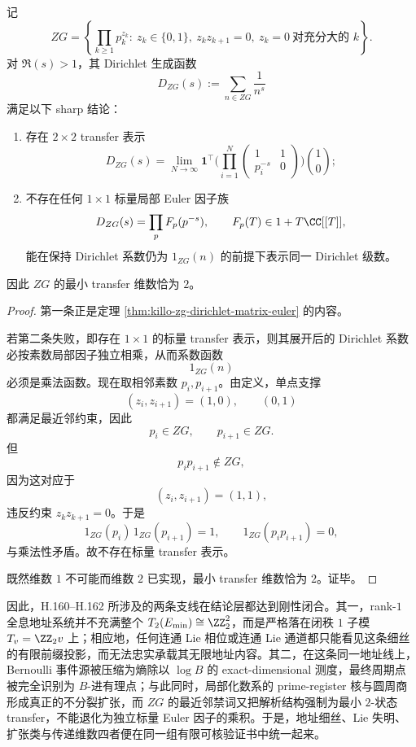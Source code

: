 \begin{theorem}\label{thm:conclusion-zg-minimal-transfer-dimension-two}
记
\[
ZG=
\left\{
\prod_{k\ge 1}p_k^{z_k}:\ z_k\in\{0,1\},\ z_kz_{k+1}=0,\ z_k=0\ \text{对充分大的 }k
\right\}.
\]
对 \(\Re(s)>1\)，其 Dirichlet 生成函数
\[
D_{ZG}(s):=\sum_{n\in ZG}\frac{1}{n^s}
\]
满足以下 sharp 结论：
\begin{enumerate}
  \item 存在 \(2\times 2\) transfer 表示
  \[
  D_{ZG}(s)
  =
  \lim_{N\to\infty}
  \mathbf 1^\top
  \Biggl(
  \prod_{i=1}^{N}
  \begin{pmatrix}
  1&1\\
  p_i^{-s}&0
  \end{pmatrix}
  \Biggr)
  \binom10;
  \]
  \item 不存在任何 \(1\times 1\) 标量局部 Euler 因子族
  \[
  D_{ZG}(s)=\prod_{p}F_p(p^{-s}),
  \qquad
  F_p(T)\in 1+T\CC[[T]],
  \]
  能在保持 Dirichlet 系数仍为 \(1_{ZG}(n)\) 的前提下表示同一 Dirichlet 级数。
\end{enumerate}
因此 \(ZG\) 的最小 transfer 维数恰为 \(2\)。
\end{theorem}
\begin{proof}
第一条正是定理 \ref{thm:killo-zg-dirichlet-matrix-euler} 的内容。

若第二条失败，即存在 \(1\times 1\) 的标量 transfer 表示，则其展开后的 Dirichlet 系数必按素数局部因子独立相乘，从而系数函数
\[
1_{ZG}(n)
\]
必须是乘法函数。现在取相邻素数 \(p_i,p_{i+1}\)。由定义，单点支撑
\[
(z_i,z_{i+1})=(1,0),\qquad (0,1)
\]
都满足最近邻约束，因此
\[
p_i\in ZG,
\qquad
p_{i+1}\in ZG.
\]
但
\[
p_ip_{i+1}\notin ZG,
\]
因为这对应于
\[
(z_i,z_{i+1})=(1,1),
\]
违反约束 \(z_kz_{k+1}=0\)。于是
\[
1_{ZG}(p_i)\,1_{ZG}(p_{i+1})=1,
\qquad
1_{ZG}(p_ip_{i+1})=0,
\]
与乘法性矛盾。故不存在标量 transfer 表示。

既然维数 \(1\) 不可能而维数 \(2\) 已实现，最小 transfer 维数恰为 \(2\)。证毕。
\end{proof}

\noindent
因此，H.160--H.162 所涉及的两条支线在结论层都达到刚性闭合。其一，rank-\(1\) 全息地址系统并不充满整个 \(T_2(E_{\min})\cong \ZZ_2^2\)，而是严格落在闭秩 \(1\) 子模 \(T_v=\ZZ_2v\) 上；相应地，任何连通 Lie 相位或连通 Lie 通道都只能看见这条细丝的有限前缀投影，而无法忠实承载其无限地址内容。其二，在这条同一地址线上，Bernoulli 事件源被压缩为熵除以 \(\log B\) 的 exact-dimensional 测度，最终周期点被完全识别为 \(B\)-进有理点；与此同时，局部化数系的 prime-register 核与圆周商形成真正的不分裂扩张，而 \(ZG\) 的最近邻禁词又把解析结构强制为最小 \(2\)-状态 transfer，不能退化为独立标量 Euler 因子的乘积。于是，地址细丝、Lie 失明、扩张类与传递维数四者便在同一组有限可核验证书中统一起来。

\endinput
